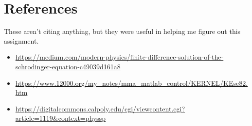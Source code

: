 \documentclass[10pt, oneside, letterpaper]{article}
\begin{document}
\newpage
\section{References}

These aren't citing anything, but they were useful in helping me figure out this assignment.

\begin{itemize}
    \item\url{https://medium.com/modern-physics/finite-difference-solution-of-the-schrodinger-equation-c49039d161a8}
    \item\url{https://www.12000.org/my_notes/mma_matlab_control/KERNEL/KEse82.htm}
    \item\url{https://digitalcommons.calpoly.edu/cgi/viewcontent.cgi?article=1119&context=physsp}
\end{itemize}
\end{document}

